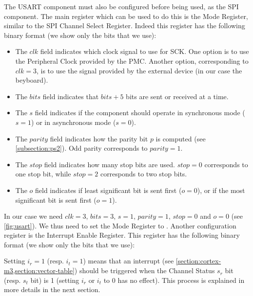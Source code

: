The USART component must also be configured before being used, as the SPI
component. The main register which can be used to do this is the Mode Register,
similar to the SPI Channel Select Register. Indeed this register has the
following binary format (we show only the bits that we use):

\begin{flushright}
\end{flushright}

\begin{itemize}
  \item The $clk$ field indicates which clock signal to use for SCK. One option
  is to use the Peripheral Clock provided by the PMC. Another option,
  corresponding to $clk=3$, is to use the signal provided by the external
  device (in our case the beyboard).

  \item The $bits$ field indicates that $bits+5$ bits are sent or received at a
  time.

  \item The $s$ field indicates if the component should operate in synchronous
  mode ($s=1$) or in asynchronous mode ($s=0$).

  \item The $parity$ field indicates how the parity bit $p$ is computed (see
  \cref{subsection:ps2}). Odd parity corresponds to $parity=1$.

  \item The $stop$ field indicates how many stop bits are used. $stop=0$
  corresponds to one stop bit, while $stop=2$ corresponds to two stop bits.

  \item The $o$ field indicates if least significant bit is sent first
  ($o=0$), or if the most significant bit is sent first ($o=1$).
\end{itemize}

In our case we need $clk=3$, $bits=3$, $s=1$, $parity=1$, $stop=0$ and $o=0$
(see \cref{fig:usart}). We thus need to set the Mode Register to .
Another configuration register is the Interrupt Enable Register. This register
has the following binary format (we show only the bits that we use):

\begin{flushright}
\end{flushright}

\noindent Setting $i_r=1$ (resp. $i_t=1$) means that an interrupt (see
\cref{section:cortex-m3,section:vector-table}) should be triggered when the
Channel Status $s_r$ bit (resp. $s_t$ bit) is 1 (setting $i_r$ or $i_t$ to 0
has no effect). This process is explained in more details in the next section.

